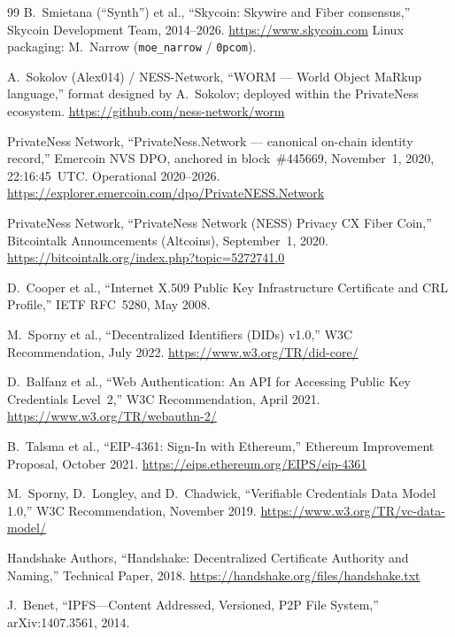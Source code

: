 \documentclass[11pt,a4paper]{article}
\begin{document}
\begin{thebibliography}{99}
  B.~Smietana (``Synth'') et al.,
  ``Skycoin: Skywire and Fiber consensus,''
  Skycoin Development Team, 2014--2026.
  \url{https://www.skycoin.com}
  Linux packaging: M.~Narrow (\texttt{moe\_narrow} / \texttt{0pcom}).

  A.~Sokolov (Alex014) / NESS-Network,
  ``WORM --- World Object MaRkup language,''
  format designed by A.~Sokolov; deployed within the PrivateNess ecosystem.
  \url{https://github.com/ness-network/worm}

  PrivateNess Network,
  ``PrivateNess.Network --- canonical on-chain identity record,''
  Emercoin NVS DPO, anchored in block~\#445669,
  November~1, 2020, 22:16:45~UTC.  Operational 2020--2026.
  \url{https://explorer.emercoin.com/dpo/PrivateNESS.Network}

  PrivateNess Network,
  ``PrivateNess Network (NESS) Privacy CX Fiber Coin,''
  Bitcointalk Announcements (Altcoins), September~1, 2020.
  \url{https://bitcointalk.org/index.php?topic=5272741.0}

  D.~Cooper et al.,
  ``Internet X.509 Public Key Infrastructure Certificate and CRL Profile,''
  IETF RFC~5280, May 2008.

  M.~Sporny et al.,
  ``Decentralized Identifiers (DIDs) v1.0,''
  W3C Recommendation, July 2022.
  \url{https://www.w3.org/TR/did-core/}

  D.~Balfanz et al.,
  ``Web Authentication: An API for Accessing Public Key Credentials Level~2,''
  W3C Recommendation, April 2021.
  \url{https://www.w3.org/TR/webauthn-2/}

  B.~Talsma et al.,
  ``EIP-4361: Sign-In with Ethereum,''
  Ethereum Improvement Proposal, October 2021.
  \url{https://eips.ethereum.org/EIPS/eip-4361}

  M.~Sporny, D.~Longley, and D.~Chadwick,
  ``Verifiable Credentials Data Model 1.0,''
  W3C Recommendation, November 2019.
  \url{https://www.w3.org/TR/vc-data-model/}

  Handshake Authors,
  ``Handshake: Decentralized Certificate Authority and Naming,''
  Technical Paper, 2018.
  \url{https://handshake.org/files/handshake.txt}

  J.~Benet,
  ``IPFS---Content Addressed, Versioned, P2P File System,''
  arXiv:1407.3561, 2014.

\end{thebibliography}
\end{document}
